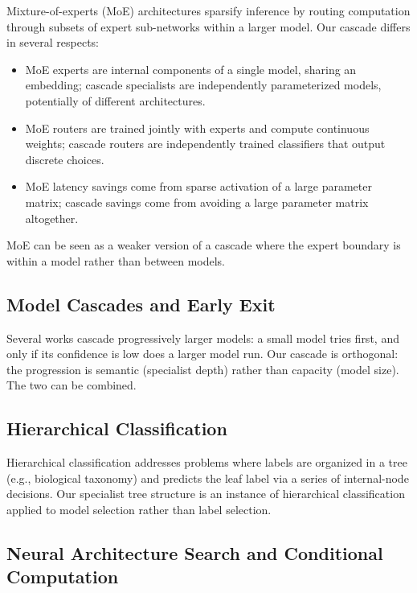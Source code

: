 \documentclass[11pt,twocolumn,a4paper]{article}
\theoremstyle{definition}
\theoremstyle{remark}
\begin{document}
Mixture-of-experts (MoE) architectures \citep{jacobs1991adaptive, shazeer2017outrageously, fedus2022switch} sparsify inference by routing computation through subsets of expert sub-networks within a larger model. Our cascade differs in several respects:
\begin{itemize}
    \item MoE experts are internal components of a single model, sharing an embedding; cascade specialists are independently parameterized models, potentially of different architectures.
    \item MoE routers are trained jointly with experts and compute continuous weights; cascade routers are independently trained classifiers that output discrete choices.
    \item MoE latency savings come from sparse activation of a large parameter matrix; cascade savings come from avoiding a large parameter matrix altogether.
\end{itemize}
MoE can be seen as a weaker version of a cascade where the expert boundary is within a model rather than between models.

\subsection{Model Cascades and Early Exit}

Several works \citep{panda2016conditional, bolukbasi2017adaptive} cascade progressively larger models: a small model tries first, and only if its confidence is low does a larger model run. Our cascade is orthogonal: the progression is semantic (specialist depth) rather than capacity (model size). The two can be combined.

\subsection{Hierarchical Classification}

Hierarchical classification \citep{silla2011survey} addresses problems where labels are organized in a tree (e.g., biological taxonomy) and predicts the leaf label via a series of internal-node decisions. Our specialist tree structure is an instance of hierarchical classification applied to model selection rather than label selection.

\subsection{Neural Architecture Search and Conditional Computation}
\end{document}

